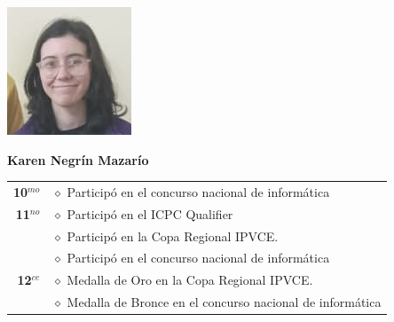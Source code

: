 \begin{minipage}{0.2\textwidth}
	\includegraphics[width=\linewidth]{img/concursantes/karen.png} %
\end{minipage}
\hfill
\begin{minipage}{0.7\textwidth}
	\textbf{Karen Negrín Mazarío}
	
	\vspace*{0.1in}
	\begin{tabular}{rl}
		
		\textbf{10$^{mo}$} &  $\diamond$ Participó en el concurso nacional de informática \\
		
		\textbf{11$^{no}$} & $\diamond$ Participó en el ICPC Qualifier \\
						   & $\diamond$ Participó en la Copa Regional IPVCE. \\			
		                   & $\diamond$ Participó en el concurso nacional de informática \\
		
		\textbf{12$^{ce}$} & $\diamond$ Medalla de Oro en la Copa Regional IPVCE.  \\
		                   &  $\diamond$ Medalla de Bronce en el concurso nacional de informática \\
		                    
		
		
	\end{tabular}
\end{minipage}



